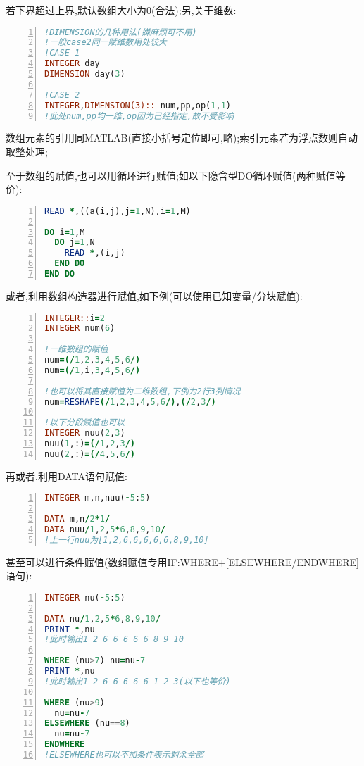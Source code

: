 若下界超过上界,默认数组大小为0(合法);另,关于维数:

\begin{lstlisting}[numbers=left,frame=single,language=Fortran]
!DIMENSION的几种用法(嫌麻烦可不用)
!一般case2同一赋维数用处较大
!CASE 1
INTEGER day
DIMENSION day(3)

!CASE 2
INTEGER,DIMENSION(3):: num,pp,op(1,1)
!此处num,pp均一维,op因为已经指定,故不受影响
\end{lstlisting}
\par

数组元素的引用同MATLAB(直接小括号定位即可,略);索引元素若为浮点数则自动取整处理;

至于数组的赋值,也可以用循环进行赋值;如以下隐含型DO循环赋值(两种赋值等价):

\begin{lstlisting}[numbers=left,frame=single,language=Fortran]
READ *,((a(i,j),j=1,N),i=1,M)

DO i=1,M
  DO j=1,N
    READ *,(i,j)
  END DO
END DO
\end{lstlisting}
\par

或者,利用数组构造器进行赋值,如下例(可以使用已知变量/分块赋值):

\begin{lstlisting}[numbers=left,frame=single,language=Fortran]
INTEGER::i=2
INTEGER num(6)

!一维数组的赋值
num=(/1,2,3,4,5,6/)
num=(/1,i,3,4,5,6/)

!也可以将其直接赋值为二维数组,下例为2行3列情况
num=RESHAPE(/1,2,3,4,5,6/),(/2,3/)

!以下分段赋值也可以
INTEGER nuu(2,3)
nuu(1,:)=(/1,2,3/)
nuu(2,:)=(/4,5,6/)
\end{lstlisting}
\par

再或者,利用DATA语句赋值:

\begin{lstlisting}[numbers=left,frame=single,language=Fortran]
INTEGER m,n,nuu(-5:5)

DATA m,n/2*1/
DATA nuu/1,2,5*6,8,9,10/
!上一行nuu为[1,2,6,6,6,6,6,8,9,10]
\end{lstlisting}
\par

甚至可以进行条件赋值(数组赋值专用IF:WHERE+[ELSEWHERE/ENDWHERE]语句):
\begin{lstlisting}[numbers=left,frame=single,language=Fortran]
INTEGER nu(-5:5)

DATA nu/1,2,5*6,8,9,10/
PRINT *,nu
!此时输出1 2 6 6 6 6 6 8 9 10

WHERE (nu>7) nu=nu-7
PRINT *,nu
!此时输出1 2 6 6 6 6 6 1 2 3(以下也等价)

WHERE (nu>9)
  nu=nu-7
ELSEWHERE (nu==8)
  nu=nu-7
ENDWHERE
!ELSEWHERE也可以不加条件表示剩余全部
\end{lstlisting}
\par

